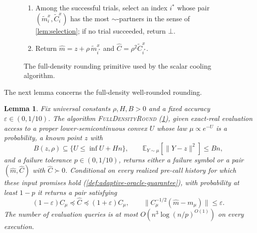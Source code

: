 \documentclass[11pt]{article}
\numberwithin{equation}{section}
\newenvironment{fminipage}%
  {\begin{Sbox}\begin{minipage}}%
  {\end{minipage}\end{Sbox}\fbox{\TheSbox}}
\newenvironment{algbox}[0]{\vskip 0.2in
\noindent
\begin{fminipage}{6.3in}
}{
\end{fminipage}
\vskip 0.2in
}
\newtheorem{lemma}{Lemma}[section]
\theoremstyle{definition}
\newcommand{\eps}{\varepsilon}
\newcommand{\R}{\mathbb{R}}
\newcommand{\E}[2]{\mathbb{E}_{#1}\left[#2\right]}
\newcommand{\algname}[1]{\textnormal{\textsc{#1}}}
\begin{document}
\begin{figure}[H]
\begin{algbox}
\begin{enumerate}[leftmargin=*,itemsep=2pt]
\begin{enumerate}[itemsep=1pt]
  $\widetilde C_i=A_i^{-1}\widehat C_iA_i^{-\top}$, and let
  $\widetilde m_i^x\in\R^n$ and
  $\widetilde C_i^x\in\R^{n\times n}$ be their blocks on the first
  $n$ coordinates.
  If $\widetilde C_i^x$ is not positive definite, mark trial $i$ failed.
  \end{enumerate}
\item Among the successful trials, select an index $i^*$ whose pair
  $(\widetilde m_i^x,\widetilde C_i^x)$ has the most
  $\sim$-partners in the sense of \cref{lem:selection}; if no trial succeeded,
  return
  $\bot$.
\item Return $\widehat m=z+\rho\,\widetilde m_{i^*}^x$ and
  $\widehat C=\rho^2\widetilde C_{i^*}^x$.
\end{enumerate}
\end{algbox}
\caption{The full-density rounding primitive used by the scalar
cooling algorithm.}
\label{fig:full-density-round}
\end{figure}

The next lemma concerns the full-density well-rounded rounding.

\begin{lemma}
\label{lem:fdwr}
Fix universal constants $\rho,H,B>0$ and a fixed accuracy
$\eps\in(0,1/10)$.
The algorithm \algname{FullDensityRound} (\cref{fig:full-density-round}), given
exact-real evaluation access to a proper lower-semicontinuous convex $U$ whose
law
$\mu\propto e^{-U}$ is a probability, a known point
$z$ with
\[
 B(z,\rho)\subseteq\{U\leq\inf U+Hn\},
 \qquad
 \E{Y\sim\mu}{\|Y-z\|^2}\leq Bn ,
\]
and a failure tolerance $p\in(0,1/10)$, returns either a failure symbol or a
pair
$(\widehat m,\widehat C)$ with
$\widehat C\succ0$.
Conditional on every realized pre-call history for which these input promises
hold (\cref{def:adaptive-oracle-guarantee}), with probability at least $1-p$ it
returns a pair satisfying
\[
(1-\eps)C_\mu
\preceq\widehat C
\preceq(1+\eps)C_\mu,
\qquad
\|C_\mu^{-1/2}(\widehat m-m_\mu)\|\leq\eps .
\]
The number of evaluation queries is at most $O(n^3\log(n/p)^{O(1)})$ on every
execution.
\end{lemma}
\end{document}
